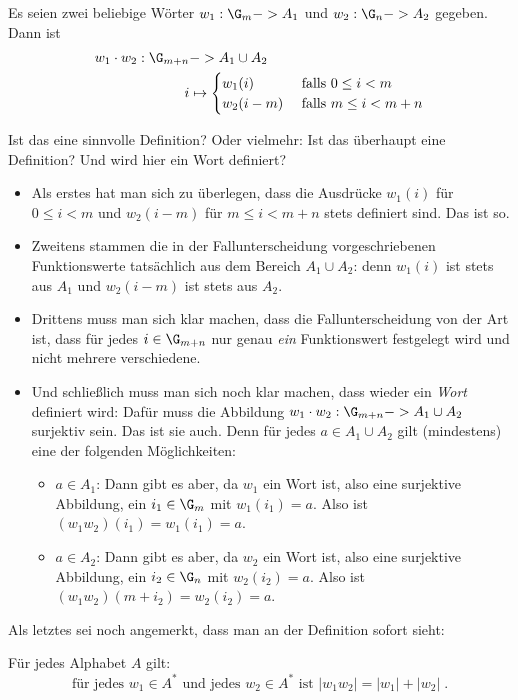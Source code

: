 \begin{definition}
\label{def:konkatenation}
Es seien zwei beliebige Wörter $w_1:\G_m -> A_1$ und $w_2:\G_n -> A_2$
gegeben. Dann ist
%
\begin{align*}
  w_1\cdot w_2 : \G_{m+n} &-> A_1\cup A_2 \\
                        i & \mapsto \begin{cases}
                                    w_1(i) & \text{ falls } 0\leq i<m \\
                                    w_2(i-m) & \text{ falls } m \leq i<m+n
                                    \end{cases}
\end{align*}
\end{definition}
%
Ist das eine sinnvolle Definition? Oder vielmehr: Ist das überhaupt
eine Definition? Und wird hier ein Wort definiert?
\begin{itemize}
\item Als erstes hat man sich zu überlegen, dass die Ausdrücke
  $w_1(i)$ für $0\leq i<m$ und $w_2(i-m)$ für $m \leq i<m+n$ stets
  definiert sind. Das ist so.
\item Zweitens stammen die in der Fallunterscheidung vorgeschriebenen
  Funktionswerte tatsächlich aus dem Bereich $A_1\cup A_2$: denn
  $w_1(i)$ ist stets aus $A_1$ und $w_2(i-m)$ ist stets aus $A_2$.
\item Drittens muss man sich klar machen, dass die Fallunterscheidung
  von der Art ist, dass für jedes $i\in \G_{m+n}$ nur genau \emph{ein}
  Funktionswert festgelegt wird und nicht mehrere verschiedene.
\item Und schließlich muss man sich noch klar machen, dass wieder ein
  \emph{Wort} definiert wird: Dafür muss die Abbildung
  $w_1\cdot w_2 : \G_{m+n} -> A_1\cup A_2$ surjektiv sein. Das ist sie
  auch. Denn für jedes $a\in A_1\cup A_2$ gilt (mindestens) eine der
  folgenden Möglichkeiten:
  \begin{itemize}
  \item $a\in A_1$: Dann gibt es aber, da $w_1$ ein Wort ist, also
    eine surjektive Abbildung, ein $i_1\in \G_m$ mit $w_1(i_1)=a$. Also
    ist $(w_1w_2)(i_1) = w_1(i_1) = a$.
  \item $a\in A_2$: Dann gibt es aber, da $w_2$ ein Wort ist, also
    eine surjektive Abbildung, ein $i_2\in \G_n$ mit $w_2(i_2)=a$. Also
    ist $(w_1w_2)(m+i_2) = w_2(i_2) = a$.
  \end{itemize}
\end{itemize}
%
Als letztes sei noch angemerkt, dass man an der Definition sofort
sieht:
\begin{lemma}
  \label{lem:laenge-homomorph}
  Für jedes Alphabet $A$ gilt:
  \[
  \text{für jedes } w_1\in A^* \text{ und jedes } w_2\in A^* \text{ ist } |w_1w_2| = |w_1| + |w_2| \;.
  \]
\end{lemma}

